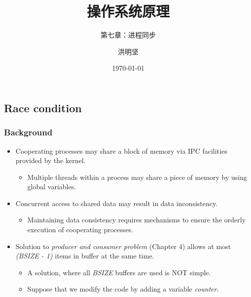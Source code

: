 \documentclass[CJKutf8,xcolor=pdftex,dvipsnames,table]{beamer}
\begin{document}
\begin{CJK*}{UTF8}{song}

  \title{ 操作系统原理}
  \subtitle{ 第七章：进程同步}
  \author{ 洪明坚}
  \date{\today}


  \frame{\titlepage}


\section{Race condition}

  \begin{frame}
  \frametitle{Background} \pause
  \begin{itemize}
  \item{Cooperating processes may share a block of memory via IPC facilities provided by the kernel.} \pause
    \begin{itemize}
    \item{Multiple threads within a process may share a piece of memory by using global variables.} \pause
    \end{itemize}
  \item{Concurrent access to shared data may result in data inconsistency.} \pause
    \begin{itemize}
    \item{Maintaining data consistency requires mechanisms to ensure the orderly execution of cooperating processes.} \pause
    \end{itemize}
  \item{Solution to \emph{producer and consumer problem} (Chapter 4) allows at most \textit{(BSIZE - 1)} items in buffer at the same time.} \pause
    \begin{itemize}
    \item{A solution, where all \textit{BSIZE} buffers are used is NOT simple.} \pause
    \item{Suppose that we modify the code by adding a variable \textit{counter}.}
    \end{itemize}
  \end{itemize}
  \end{frame}


\end{CJK*}
\end{document}
